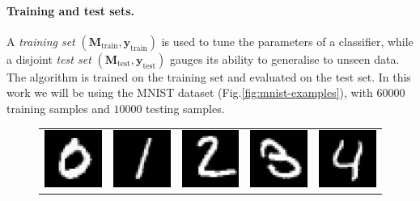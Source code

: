 \documentclass[twocolumn]{article} %
\begin{document}
\paragraph{Training and test sets.}
A \emph{training set}
$(\mathbf M_{\text{train}},\mathbf y_{\text{train}})$
is used to tune the parameters of a classifier, while a disjoint
\emph{test set}
$(\mathbf M_{\text{test}},\mathbf y_{\text{test}})$
gauges its ability to generalise to unseen data. 
The algorithm is trained on the training set and evaluated on the test set. In this work we will be using the MNIST dataset (Fig.\ref{fig:mnist-examples}), with $60000$ training samples and $10000$ testing samples.

\begin{figure}[htbp]
  \centering
  \setlength{\tabcolsep}{2pt}
  \renewcommand{\arraystretch}{0}
  \begin{tabular}{ccccc} %
    \includegraphics[width=0.18\linewidth]{figures/digits/digits_0.png} & %
    \includegraphics[width=0.18\linewidth]{figures/digits/digits_1.png} & %
    \includegraphics[width=0.18\linewidth]{figures/digits/digits_2.png} & %
    \includegraphics[width=0.18\linewidth]{figures/digits/digits_3.png} & %
    \includegraphics[width=0.18\linewidth]{figures/digits/digits_4.png} \\ %

\end{tabular}
\end{figure}
\end{document}
